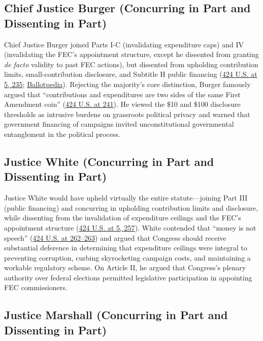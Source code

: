\documentclass[12pt]{article}
\begin{document}
\subsection{Chief Justice Burger (Concurring in Part and Dissenting in Part)}

Chief Justice Burger joined Parts I-C (invalidating expenditure caps) and IV (invalidating the FEC's appointment structure, except he dissented from granting \textit{de facto} validity to past FEC actions), but dissented from upholding contribution limits, small-contribution disclosure, and Subtitle H public financing (\href{https://supreme.justia.com/cases/federal/us/424/1/}{424 U.S. at 5, 235}; \href{https://ballotpedia.org/Buckley_v._Valeo}{Ballotpedia}). Rejecting the majority's core distinction, Burger famously argued that ``contributions and expenditures are two sides of the same First Amendment coin'' (\href{https://edge.sagepub.com/epsteinshort9e/student-resources/chapter-5-the-executive/buckley-v-valeo-1976}{424 U.S. at 241}). He viewed the \$10 and \$100 disclosure thresholds as intrusive burdens on grassroots political privacy and warned that government financing of campaigns invited unconstitutional governmental entanglement in the political process.

\subsection{Justice White (Concurring in Part and Dissenting in Part)}

Justice White would have upheld virtually the entire statute---joining Part III (public financing) and concurring in upholding contribution limits and disclosure, while dissenting from the invalidation of expenditure ceilings and the FEC's appointment structure (\href{https://supreme.justia.com/cases/federal/us/424/1/}{424 U.S. at 5, 257}). White contended that ``money is not speech'' (\href{https://edge.sagepub.com/epsteinshort9e/student-resources/chapter-5-the-executive/buckley-v-valeo-1976}{424 U.S. at 262--263}) and argued that Congress should receive substantial deference in determining that expenditure ceilings were integral to preventing corruption, curbing skyrocketing campaign costs, and maintaining a workable regulatory scheme. On Article II, he argued that Congress's plenary authority over federal elections permitted legislative participation in appointing FEC commissioners.

\subsection{Justice Marshall (Concurring in Part and Dissenting in Part)}
\end{document}
